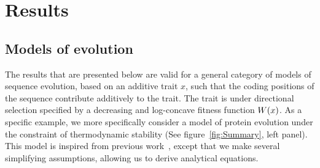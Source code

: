 \section{Results}

\subsection{Models of evolution}

The results that are presented below are valid for a general category of models of sequence evolution, based on an additive trait $x$, such that the coding positions of the sequence contribute additively to the trait.
The trait is under directional selection specified by a decreasing and log-concave fitness function $ W (x)$.
As a specific example, we more specifically consider a model of protein evolution under the constraint of thermodynamic stability (See figure~\ref{fig:Summary}, left panel).
This model is inspired from previous work~\citep{Williams2006, Goldstein2011, Pollock2012}, except that we make several simplifying assumptions, allowing us to derive analytical equations.

